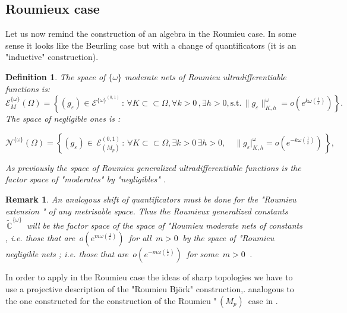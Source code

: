 \documentclass[12pt,a4paper]{amsart}
\newcommand{\CC}{\mathbb C}
\newtheorem{definition}[theorem]{Definition}
\newtheorem{remark}[theorem]{Remark}
\begin{document}
\subsection{Roumieux case}  
                            
Let us now remind the construction of an algebra in the Roumieu case. In some sense it looks like the Beurling case but with a change of quantificators (it is an "inductive" construction).
\begin{definition}

The space of $\{\omega\}$ moderate nets of Roumieu ultradifferentiable functions is:
   \begin{equation*}
\mathcal{E}^{\{\omega\}}_M(\Omega) = \left\{(g_{\varepsilon}) \in \mathcal{E}^{{\{\omega\}}^{(0,1)}}\,:\, \forall K \subset \subset \Omega,\forall k>0\,, \exists h>0,  \mbox{s.t.}\,
    \| g_{\varepsilon}\|_{K,h}^{\omega} =o(e^{k\omega(\frac{1}{\varepsilon})})\right\} .
\end{equation*}   
The space of negligible ones is :

\begin{equation*}
\mathcal{N}^{\{\omega\}}(\Omega) =
 \left\{(g_{\varepsilon}) \in\,
  \mathcal{E}^{(0,1)}_{(M_p)}
 \,:\, 
 \forall K \subset \subset \Omega, \exists k>0\,\exists h>0 ,\quad
\|g_{\varepsilon}|_ {K,h}^{\omega} =
 o(e^{-k\omega(\frac{1}{\varepsilon})}) \,\right\},
 \end{equation*}
 
As previously the space of Roumieu generalized ultradifferentiable functions is the factor space of "moderates" by "negligibles" .

\end{definition}


\begin{remark}
An analogous shift of quantificators must be done for the "Roumieu extension " of any metrisable space. Thus the 
 Roumieux generalized constants
 $\,\tilde{\CC}^{\{\omega\}}\,$  will be the factor space of the space of "Roumieu moderate nets of constants , i.e. those that are
  $\,o(e^{m\omega (\frac{1}{\varepsilon})})\,$ for all
  $\,m>0\,$ 
  by the space of "Roumieu negligible nets ; i.e. those 
  that are
  $\,o(e^{-m\omega (\frac{1}{\varepsilon})})\,$ for some
  $\,m>0\,$ .
  
  \end{remark}
  
  In order to apply in the Roumieu case the ideas of sharp topologies  we have to use a  projective description of the "Roumieu Bj\"{o}rk" construction,. analogous to the one constructed for the construction of the Roumieu "$\,(M_p)\,$ case in  \cite{D.V.V.}.
  
\end{document}
